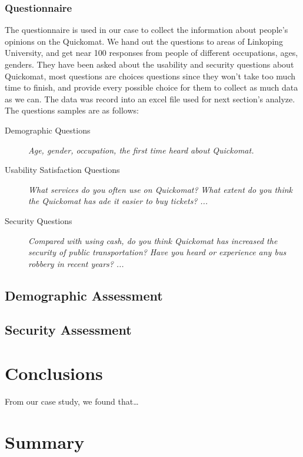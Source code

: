 \documentclass[twocolumn]{article}
\begin{document}
\subsubsection{Questionnaire}
The questionnaire is used in our case to collect the information about people’s opinions on the Quickomat. We hand out the questions to areas of Linkoping University, and get near 100 responses from people of different occupations, ages, genders. They have been asked about the usability and security questions about Quickomat, most questions are choices questions since they won’t take too much time to finish, and provide every possible choice for them to collect as much data as we can. The data was record into an excel file used for next section’s analyze. The questions samples are as follows:
\begin{description}
\item[Demographic Questions]
    \emph{Age, gender, occupation, the first time heard about Quickomat.}
\item[Usability Satisfaction Questions]
    \emph{What services do you often use on Quickomat?}
    \emph{What extent do you think the Quickomat has ade it easier to buy tickets?}
    \emph{...}
\item[Security Questions]
    \emph{Compared with using cash, do you think Quickomat has increased the security of public transportation?}
    \emph{Have you heard or experience any bus robbery in recent years?}
    \emph{...}
\end{description}

\subsection{Demographic Assessment}

\subsection{Security Assessment}

\section{Conclusions}
From our case study, we found that…

\section{Summary}

\cite{*}


\end{document}
